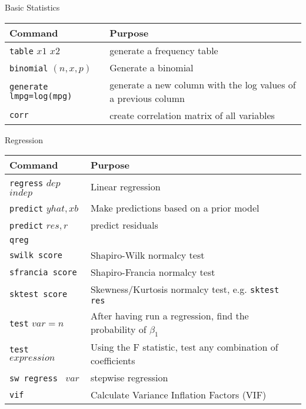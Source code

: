 \documentclass[11pt, oneside]{article}   	%
\begin{document}
\begin{center}
\large{Basic Statistics}
\end{center}

\begin{tabular}{l p{ } }
Command & Purpose \\
\hline
\texttt{table} $x1$ $x2$ & generate a frequency table \\

\texttt{binomial} $(n,x,p)$ & Generate a binomial \\

\texttt{generate lmpg=log(mpg)} & generate a new column with the log values of a previous column \\

\texttt{corr} & create correlation matrix of all variables \\

\end{tabular}



\begin{center}
\large{Regression}
\end{center}

\begin{tabular}{l p{ } }
Command & Purpose \\
\hline
\texttt{regress} $dep$ $indep$ & Linear regression \\ 

\texttt{predict} $yhat, xb$ & Make predictions based on a prior model \\

\texttt{predict} $res, r$ & predict residuals \\

\texttt{qreg} &  \\

\texttt{swilk score} & Shapiro-Wilk normalcy test \\

\texttt{sfrancia score} & Shapiro-Francia normalcy test \\

\texttt{sktest score} & Skewness/Kurtosis normalcy test, e.g. \texttt{sktest res} \\

\texttt{test} $var=n$ & After having run a regression, find the probability of $\beta_1$ \\

\texttt{test } $expression$ & Using the F statistic, test any combination of coefficients \\

\texttt{sw regress } $var$ & stepwise regression\\

\texttt{vif}  & Calculate Variance Inflation Factors (VIF) \\


\end{tabular}
\end{document}
